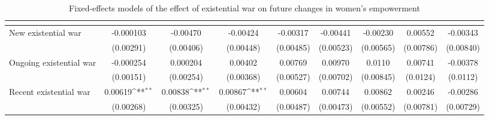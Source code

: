 \begin{table}[htbp]\centering
\def\sym#1{\ifmmode^{#1}\else\(^{#1}\)\fi}
\caption{Fixed-effects models of the effect of existential war on future changes in women's empowerment\label{existentialwarpolempower}}
\begin{tabular}{l*{8}{c}}
\hline\hline
                    &&&&&&&&\\
\hline
New existential war            &   -0.000103         &    -0.00470         &    -0.00424         &    -0.00317         &    -0.00441         &    -0.00230         &     0.00552         &    -0.00343         \\
                    &   (0.00291)         &   (0.00406)         &   (0.00448)         &   (0.00485)         &   (0.00523)         &   (0.00565)         &   (0.00786)         &   (0.00840)         \\
[1em]
Ongoing existential war         &   -0.000254         &    0.000204         &     0.00402         &     0.00769         &     0.00970         &      0.0110         &     0.00741         &    -0.00378         \\
                    &   (0.00151)         &   (0.00254)         &   (0.00368)         &   (0.00527)         &   (0.00702)         &   (0.00845)         &    (0.0124)         &    (0.0112)         \\
[1em]
Recent existential war       &     0.00619\sym{**} &     0.00838\sym{**} &     0.00867\sym{**} &     0.00604         &     0.00744         &     0.00862         &     0.00246         &    -0.00286         \\
                    &   (0.00268)         &   (0.00325)         &   (0.00432)         &   (0.00487)         &   (0.00473)         &   (0.00552)         &   (0.00781)         &   (0.00729)         \\

\end{tabular}
\end{table}
